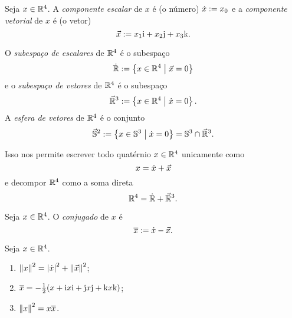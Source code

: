 \begin{definition}
Seja $x \in \mathbb{R}^4$. A \emph{componente escalar} de $x$ é (o número) $\dot{x} := x_0$ e a \emph{componente vetorial} de $x$ é (o vetor)
	\begin{equation*}
	\vec{x} := x_1 \mathrm{i} + x_2 \mathrm{j} + x_3 \mathrm{k}.
	\end{equation*}

O \emph{subespaço de escalares} de $\mathbb{R}^4$ é o subespaço
	\begin{equation*}
	\dot{\mathbb{R}} := \left\{{x \in \mathbb{R}^4}\;\middle\vert\;{\vec{x}=0}\right\}
	\end{equation*}
e o \emph{subespaço de vetores} de $\mathbb{R}^4$ é o subespaço
	\begin{equation*}
	\vec{\mathbb{R}}^3 := \left\{{x \in \mathbb{R}^4}\;\middle\vert\;{\dot{x}=0}\right\}.
	\end{equation*}
A \emph{esfera de vetores} de $\mathbb{R}^4$ é o conjunto
	\begin{equation*}
	\vec{\mathbb{S}}^2 := \left\{{x \in \mathbb{S}^3}\;\middle\vert\;{\dot{x}=0}\right\} = \mathbb{S}^3 \cap \vec{\mathbb{R}}^3.
	\end{equation*}
\end{definition}

Isso nos permite escrever todo quatérnio $x \in \mathbb{R}^4$ unicamente como
	\begin{equation*}
	x = \dot{x} + \vec{x}
	\end{equation*}
e decompor $\mathbb{R}^4$ como a soma direta
	\begin{equation*}
	\mathbb{R}^4 = \dot{\mathbb{R}} + \vec{\mathbb{R}}^3.
	\end{equation*}

\begin{definition}
Seja $x \in \mathbb{R}^4$. O \emph{conjugado} de $x$ é
	\begin{equation*}
	\overline{x} := \dot{x}-\vec{x}.
	\end{equation*}
\end{definition}

\begin{exercise}
Seja $x \in \mathbb{R}^4$.
	\begin{enumerate}
	\item $\left\Vert{x}\right\Vert^2 = \left\vert{\dot{x}}\right\vert^2 + \left\Vert{\vec{x}}\right\Vert^2$;
	\item $\overline{x} = -\frac{1}{2}(x + \mathrm{i} x \mathrm{i} + \mathrm{j} x \mathrm{j} + \mathrm{k} x \mathrm{k})$;
	\item $\left\Vert{x}\right\Vert^2 = x\overline{x}$.
	\end{enumerate}
\end{exercise}

